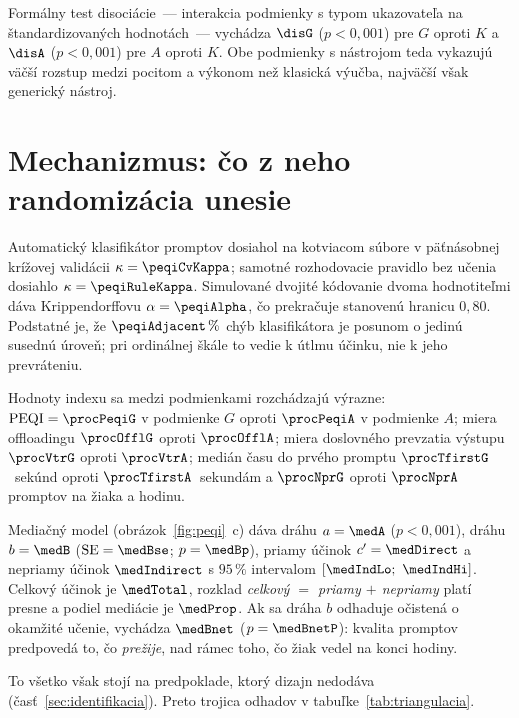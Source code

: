 Formálny test disociácie~--- interakcia podmienky s typom ukazovateľa na štandardizovaných hodnotách~--- vychádza $\disG$ ($p<0{,}001$) pre $G$ oproti $K$ a $\disA$ ($p<0{,}001$) pre $A$ oproti $K$. Obe podmienky s nástrojom teda vykazujú väčší rozstup medzi pocitom a výkonom než klasická výučba, najväčší však generický nástroj.

\section{Mechanizmus: čo z neho randomizácia unesie}
\label{sec:vysledky-mechanizmus}

Automatický klasifikátor promptov dosiahol na kotviacom súbore v päťnásobnej krížovej validácii $\kappa=\peqiCvKappa$; samotné rozhodovacie pravidlo bez učenia dosiahlo $\kappa=\peqiRuleKappa$. Simulované dvojité kódovanie dvoma hodnotiteľmi dáva Krippendorffovu $\alpha=\peqiAlpha$, čo prekračuje stanovenú hranicu $0{,}80$. Podstatné je, že $\peqiAdjacent\,\%$ chýb klasifikátora je posunom o jedinú susednú úroveň; pri ordinálnej škále to vedie k útlmu účinku, nie k jeho prevráteniu.

Hodnoty indexu sa medzi podmienkami rozchádzajú výrazne: $\mathrm{PEQI}=\procPeqiG$ v podmienke $G$ oproti $\procPeqiA$ v podmienke $A$; miera offloadingu $\procOfflG$ oproti $\procOfflA$; miera doslovného prevzatia výstupu $\procVtrG$ oproti $\procVtrA$; medián času do prvého promptu $\procTfirstG$~sekúnd oproti $\procTfirstA$~sekundám a $\procNprG$ oproti $\procNprA$ promptov na žiaka a hodinu.

Mediačný model (obrázok~\ref{fig:peqi}~c) dáva dráhu $a=\medA$ ($p<0{,}001$), dráhu $b=\medB$ ($\mathrm{SE}=\medBse$; $p=\medBp$), priamy účinok $c'=\medDirect$ a nepriamy účinok $\medIndirect$ s $95\,\%$ intervalom $[\medIndLo;\ \medIndHi]$. Celkový účinok je $\medTotal$, rozklad \emph{celkový $=$ priamy $+$ nepriamy} platí presne a podiel mediácie je $\medProp$. Ak sa dráha $b$ odhaduje očistená o okamžité učenie, vychádza $\medBnet$ ($p=\medBnetP$): kvalita promptov predpovedá to, čo \emph{prežije}, nad rámec toho, čo žiak vedel na konci hodiny.

To všetko však stojí na predpoklade, ktorý dizajn nedodáva (časť~\ref{sec:identifikacia}). Preto trojica odhadov v tabuľke~\ref{tab:triangulacia}.

